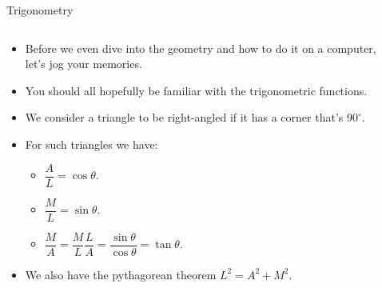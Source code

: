 \documentclass{beamer}
\begin{document}
\begin{frame}[plain]{Trigonometry}
    \begin{columns}
        \begin{column}{0.7\textwidth}
            \begin{itemize}
                \item Before we even dive into the geometry and how to do it on a computer, let's jog your memories.
                \item You should all hopefully be familiar with the trigonometric functions.
                \item We consider a triangle to be right-angled if it has a corner that's $90^{\circ}$.
                \item For such triangles we have:
                \begin{itemize}
                    \item $\dfrac{A}{L} = \cos\theta$.
                    \item $\dfrac{M}{L} = \sin\theta$.
                    \item $\dfrac{M}{A} = \dfrac{M}{L}\dfrac{L}{A} = \dfrac{\sin\theta}{\cos\theta} = \tan\theta$.
                \end{itemize}
                \item We also have the pythagorean theorem $L^2 = A^2 + M^2$.
            \end{itemize}
        \end{column}
		\begin{column}{0.3\textwidth}
			\scalebox{0.75} {
            }
        \end{column}
    \end{columns}
\end{frame}
\end{document}
